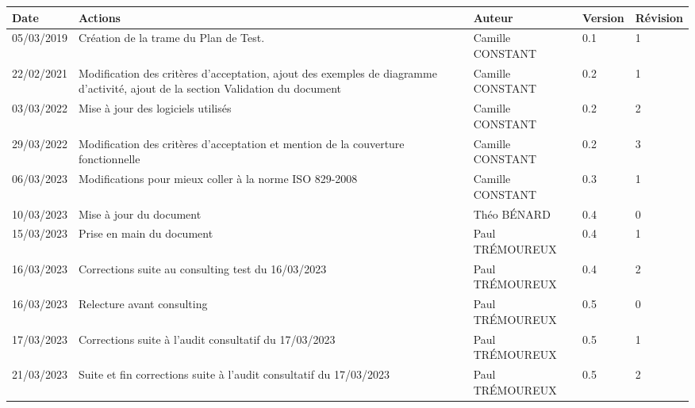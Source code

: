 
\begin{longtable}[l]{|p{2cm}|p{5.6cm}|p{2.9cm}|p{1.5cm}|p{1.7cm}|}
    \hline
        \textbf{Date} & \textbf{Actions} & \textbf{Auteur} & \textbf{Version} & \textbf{Révision}  \\
    \hline
        05/03/2019 & Création de la trame du Plan de Test. & Camille \newline CONSTANT & 0.1 & 1\\
    \hline
        22/02/2021 & Modification des critères d'acceptation, ajout des exemples de diagramme d'activité, ajout de la section Validation du document & Camille \newline CONSTANT & 0.2 & 1\\
    \hline
        03/03/2022 & Mise à jour des logiciels utilisés & Camille \newline CONSTANT & 0.2 & 2\\
    \hline
        29/03/2022 & Modification des critères d'acceptation et mention de la couverture fonctionnelle & Camille \newline CONSTANT & 0.2 & 3\\
    \hline
        06/03/2023 & Modifications pour mieux coller à la norme ISO 829-2008 & Camille \newline CONSTANT & 0.3 & 1\\
    \hline
        10/03/2023 & Mise à jour du document & Théo \newline BÉNARD & 0.4 & 0\\ 
    \hline
        15/03/2023 & Prise en main du document & Paul \newline TRÉMOUREUX & 0.4 & 1\\
    \hline
        16/03/2023 & Corrections suite au consulting test du 16/03/2023 & Paul \newline TRÉMOUREUX & 0.4 & 2\\
    \hline
        16/03/2023 & Relecture avant consulting & Paul \newline TRÉMOUREUX & 0.5 & 0\\
    \hline
        17/03/2023 & Corrections suite à l'audit consultatif du 17/03/2023 & Paul \newline TRÉMOUREUX & 0.5 & 1\\
    \hline
        21/03/2023 & Suite et fin corrections suite à l'audit consultatif du 17/03/2023 & Paul \newline TRÉMOUREUX & 0.5 & 2\\

\end{longtable}
